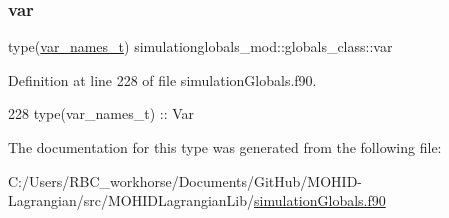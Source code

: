\subsubsection{\texorpdfstring{var}{var}}
{\footnotesize\ttfamily type(\mbox{\hyperlink{structsimulationglobals__mod_1_1var__names__t}{var\+\_\+names\+\_\+t}}) simulationglobals\+\_\+mod\+::globals\+\_\+class\+::var\hspace{0.3cm}{\ttfamily [private]}}



Definition at line 228 of file simulation\+Globals.\+f90.


\begin{DoxyCode}
228         \textcolor{keywordtype}{type}(var\_names\_t)   :: Var
\end{DoxyCode}


The documentation for this type was generated from the following file\+:\begin{DoxyCompactItemize}
\item 
C\+:/\+Users/\+R\+B\+C\+\_\+workhorse/\+Documents/\+Git\+Hub/\+M\+O\+H\+I\+D-\/\+Lagrangian/src/\+M\+O\+H\+I\+D\+Lagrangian\+Lib/\mbox{\hyperlink{simulation_globals_8f90}{simulation\+Globals.\+f90}}\end{DoxyCompactItemize}
